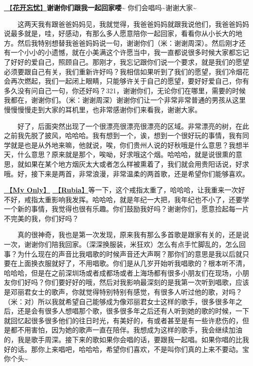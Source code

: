 \documentclass[]{ctexbook}
\begin{document}
\hyperref[no-worries]{🎵【\textbf{花开忘忧}】}\textbf{谢谢你们跟我一起回家喽\textasciitilde{}} 你们会唱吗\textasciitilde 谢谢大家\textasciitilde{}

  这两天我有跟爸爸妈妈见，我就觉得，我爸爸妈妈就跟我说他们，我爸爸妈妈说最多就是，哇，好感动，有那么多人愿意陪你一起回家，看看你从小长大的地方。然后我特别想替我爸爸妈妈说一句，谢谢你们（米：谢谢周深）。然后刚才还有一个小小的小遗憾，就在小美满这个许愿当中，我一直都说很多时候大家都忘记了好好的爱自己，照顾自己。那刚才，我忘记跟你们说一个要求，就是我们的愿望必须要跟自己有关，我们重新许好吗？我相信如果听到了我们的愿望，我们冷烟花会再次燃起，我们一起闭上眼睛，只能够许关于自己的愿望，要好好爱自己，你有多久没有问自己一句，你还好吗？321，谢谢你们，无论你们在哪里，需要的时候我都在，谢谢你们。（米：谢谢周深）谢谢你们让一个非常非常普通的男孩从这里慢慢慢慢走到大家的耳机里，也非常感谢你们来看我，谢谢大家。

  好了，后面突然出现了一个很漂亮很漂亮很漂亮的区域。非常漂亮的树，在此之前我先脱了披风，哈哈哈。我有想到一个，诶，想到一个很好玩的事情，我有同学就是也是从外地来嘛，他就说，唉，你们贵州人说的好秋哦是什么意思？我想半天，什么意思？原来就是那个，唉呦，好求哦这个烟。哈哈哈，就是说很熏的意思，就如果在某个地方烟灰太大或者怎么样被熏着了，我们就会用贵阳话说，好求哦。好，接下来是两首，非常浪漫，非常温柔的两首歌，还是希望你们能够喜欢。

\hyperref[my-only]{🎵【\textbf{My Only}】} \hyperref[rubia]{🎵【\textbf{Rubia}】}等一下，这个戒指太重了，哈哈哈，让我重来一次好不好，戒指太重影响我发挥。哈哈哈，就是年纪一大把，我年纪也不小了，还要学一个新的事情，我觉得也很有乐趣。你们鼓励我好吗？谢谢你们，愿意捡起每一片不完美的我，你们好吗？

  真的很神奇，我也是第一次发现，原来我有那么多首歌是跟家有关的，还是说一次，谢谢你们陪我回家。（深深换服装，米狂欢）怎么有点手忙脚乱的，怎么回事？为什么现在的声音比我唱歌的时候声音还大声啊？那你们的意思是我以后就只要在上面换衣服就好了，不用唱歌。你们是从几岁开始听我唱歌的？根本听不清，哈哈哈，但是在之前深圳场或者成都场或者上海场都有很多小朋友们在现场，小朋友你们好吗？你们要好好的哦，然后对我影响最深刻的是我第一次听到唱歌，应该是邓丽君女士的歌声，你就觉得特别特别有感觉，有很多人听过他的歌，对吗？（米：对）所以我就希望自己能够成为像邓丽君女士这样的歌手，很多很多年之后，还是会有很多人想唱那个歌，很多很多年之后还有人听到她的歌的时候，一下就回忆起很多很多他们的往日时光，有美好的，有或者甚至是有一些许悲伤的，但是都不用害怕，因为她的歌声一直在陪伴。我想成为这样的歌手，我会继续加油的，我是歌手周深。接下来的歌如果你会唱的话，要跟我一起唱。如果你唱的比我好的话。那你上来唱吧，哈哈哈，希望你们喜欢，不是叫你们真的上来不要动。宝你个头\textasciitilde{}
\end{document}
